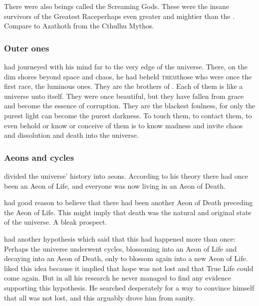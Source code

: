 There were also beings called the Screaming Gods. 
These were the insane survivors of the Greatest Race\dash perhaps even greater and mightier than the \xss.
Compare to Azathoth from the Cthulhu Mythos.





\subsubsection{Outer ones}
\Sethicus had journeyed with his mind far to the very edge of the universe.
There, on the dim shores beyond space and chaos, he had beheld \textsc{them}\dash those who were once the first race, the luminous ones. 
They are the brothers of \RuinSatha. 
Each of them is like a universe unto itself. 
They were once beautiful, but they have fallen from grace and become the essence of corruption.
They are the blackest foulness, for only the purest light can become the purest darkness. 
To touch them, to contact them, to even behold or know or conceive of them is to know madness and invite chaos and dissolution and death into the universe. 





\subsubsection{Aeons and cycles}
\Sethicus divided the universe' history into aeons. 
According to his theory there had once been an Aeon of Life, and everyone was now living in an Aeon of Death. 

\Sethicus had good reason to believe that there had been another Aeon of Death preceding the Aeon of Life.
This might imply that death was the natural and original state of the universe. 
A bleak prospect. 

\Sethicus had another hypothesis which said that this had happened more than once: 
Perhaps the universe underwent cycles, blossoming into an Aeon of Life and decaying into an Aeon of Death, only to blossom again into a new Aeon of Life. 
\Sethicus liked this idea because it implied that hope was not lost and that True Life could come again.
But in all his research he never managed to find any evidence supporting this hypothesis.
He searched desperately for a way to convince himself that all was not lost, and this arguably drove him from sanity.





